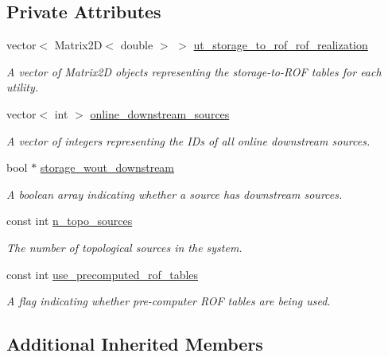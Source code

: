 \subsection*{Private Attributes}
\begin{DoxyCompactItemize}
\item 
vector$<$ Matrix2D$<$ double $>$ $>$ \mbox{\hyperlink{classContinuityModelROF_ab4b11938d295e5e74e9cf58725d36a34}{ut\+\_\+storage\+\_\+to\+\_\+rof\+\_\+rof\+\_\+realization}}
\begin{DoxyCompactList}\small\item\em A vector of {\ttfamily Matrix2D} objects representing the storage-\/to-\/\+R\+OF tables for each utility. \end{DoxyCompactList}\item 
vector$<$ int $>$ \mbox{\hyperlink{classContinuityModelROF_a7ab0c5f22272833f309183937fa9d0d8}{online\+\_\+downstream\+\_\+sources}}
\begin{DoxyCompactList}\small\item\em A vector of integers representing the I\+Ds of all online downstream sources. \end{DoxyCompactList}\item 
bool $\ast$ \mbox{\hyperlink{classContinuityModelROF_ad7ee977c92769377cf6237d2fbf527e3}{storage\+\_\+wout\+\_\+downstream}}
\begin{DoxyCompactList}\small\item\em A boolean array indicating whether a source has downstream sources. \end{DoxyCompactList}\item 
const int \mbox{\hyperlink{classContinuityModelROF_aefffec319cad3a89db2d4c7335ebf2a2}{n\+\_\+topo\+\_\+sources}}
\begin{DoxyCompactList}\small\item\em The number of topological sources in the system. \end{DoxyCompactList}\item 
const int \mbox{\hyperlink{classContinuityModelROF_a384967647c98d9768400de07e2bc7dab}{use\+\_\+precomputed\+\_\+rof\+\_\+tables}}
\begin{DoxyCompactList}\small\item\em A flag indicating whether pre-\/computer R\+OF tables are being used. \end{DoxyCompactList}\end{DoxyCompactItemize}
\subsection*{Additional Inherited Members}


